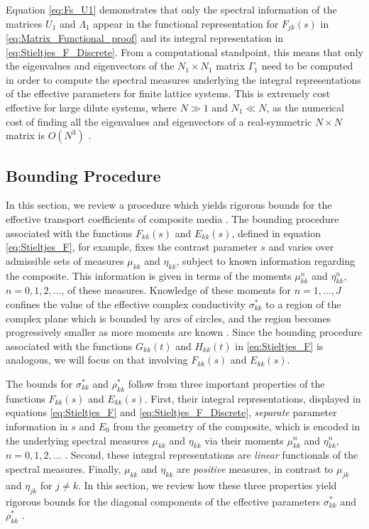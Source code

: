 \documentclass{cmslatex}
\begin{document}
Equation \eqref{eq:Fs_U1} demonstrates that only the spectral
information of the matrices $U_1$ and $\Lambda_1$ appear in the functional
representation for $F_{jk}(s)$ in
\eqref{eq:Matrix_Functional_proof} and its integral representation in
\eqref{eq:Stieltjes_F_Discrete}. From a computational standpoint, 
this means that only the eigenvalues and eigenvectors of the $N_1\times N_1$
matrix $\Gamma_1$ need to be computed in order to compute the spectral
measures underlying the integral representations of the effective
parameters for finite lattice systems. This is extremely cost
effective for large dilute systems, where $N\gg1$ and $N_1\ll N$, as the
numerical cost of finding all the eigenvalues and eigenvectors of a
real-symmetric $N\times N$ matrix is $O(N^3)$ \cite{Demmel:1997}.






\subsection{Bounding Procedure}\label{sec:Bounding_Procedure}
%
In this section, we review a procedure which yields rigorous bounds for
the effective transport coefficients of composite media
\cite{Golden:CMP-473,Golden:JMPS-333}. The bounding procedure
associated with the functions $F_{kk}(s)$ and $E_{kk}(s)$, 
defined in equation \eqref{eq:Stieltjes_F}, for example, fixes the
contrast parameter $s$ and varies over admissible sets of measures
$\mu_{kk}$ and $\eta_{kk}$, subject to
known information regarding the composite. This information is given
in terms of the moments $\mu_{kk}^n$ and $\eta_{kk}^n$, $n=0,1,2,\ldots$, of
these measures. Knowledge of these moments for $n=1,\ldots,J$ confines the
value of the effective complex conductivity $\sigma_{kk}^*$ to a region of
the complex plane which is bounded by arcs of circles, and the region
becomes progressively smaller as more moments are known
\cite{Milton:JAP-5294,Golden:JMPS-333}. Since the bounding procedure
associated with the functions $G_{kk}(t)$ and $H_{kk}(t)$ in
\eqref{eq:Stieltjes_F} is analogous, we will focus on that involving
$F_{kk}(s)$ and $E_{kk}(s)$.    


The bounds for $\sigma_{kk}^*$ and $\rho^*_{kk}$ follow from three important
properties of the functions $F_{kk}(s)$ and $E_{kk}(s)$. First, their
integral representations, displayed in equations
\eqref{eq:Stieltjes_F} and \eqref{eq:Stieltjes_F_Discrete},
\emph{separate} parameter information in $s$ and $E_0$ from the
geometry of the composite, which is encoded in the underlying spectral
measures $\mu_{kk}$ and $\eta_{kk}$ via their moments $\mu_{kk}^n$ and
$\eta_{kk}^n$, $n=0,1,2,\ldots$ \cite{Bruno:JSP-365,Golden:CMP-473}. Second,
these integral representations are \emph{linear} functionals of the
spectral measures. Finally, $\mu_{kk}$ and $\eta_{kk}$ are \emph{positive}
measures, in contrast to $\mu_{jk}$ and $\eta_{jk}$ for $j\neq k$. In this
section, we review how these three properties yield rigorous bounds
for the diagonal components of the effective parameters $\sigma^*_{kk}$ and
$\rho^*_{kk}$ \cite{Golden:CMP-473,Golden:JMPS-333}.
\end{document}
